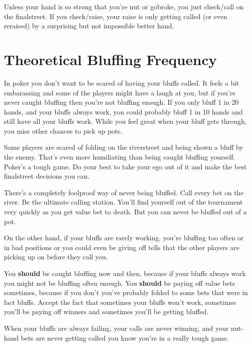 Unless your hand is so strong that you're nut or gobroke, you just
check/call on the finalstreet. If you check/raise, your raise is only
getting called (or even reraised) by a surprising but not impossible
better hand.

\section{Theoretical Bluffing Frequency}

In poker you don't want to be scared of having your bluffs called. It
feels a bit embarassing and some of the players might have a laugh at
you, but if you're never caught bluffing then you're not bluffing
enough. If you only bluff 1 in 20 hands, and your bluffs always work,
you could probably bluff 1 in 10 hands and still have all your bluffs
work. While you feel great when your bluff gets through, you miss
other chances to pick up pots.

Some players are scared of folding on the riverstreet and being shown
a bluff by the enemy. That's even more humiliating than being caught
bluffing yourself. Poker's a tough game. Do your best to take your ego
out of it and make the best finalstreet decisions you can.

There's a completely foolproof way of never being bluffed. Call every
bet on the river. Be the ultimate calling station. You'll find
yourself out of the tournament very quickly as you get value bet to
death. But you can never be bluffed out of a pot.

On the other hand, if your bluffs are rarely working, you're bluffing
too often or in bad positions or you could even be giving off tells
that the other players are picking up on before they call you.

You \textbf{should} be caught bluffing now and then, because if your
bluffs always work you might not be bluffing often enough. You
\textbf{should} be paying off value bets sometimes, because if you
don't you've probably folded to some bets that were in fact bluffs.
Accept the fact that sometimes your bluffs won't work, sometimes
you'll be paying off winners and sometimes you'll be getting bluffed.

When your bluffs are always failing, your calls are never winning,
and your nut-hand bets are never getting called
you know you're in a really tough game.
